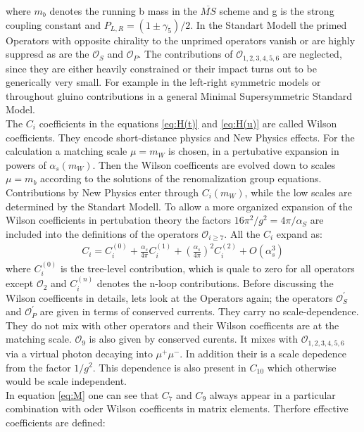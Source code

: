 \documentclass[english]{uzhpub}
\begin{document}
where $m_b$ denotes the running b mass in the $\overline{MS}$ scheme and g is the strong coupling constant and $P_{L,R} = ( 1 \pm \gamma_5)/2$. In the Standart Modell the primed Operators with opposite chirality to the unprimed operators vanish or are highly suppresd as are the $\mathcal{O}_S$ and $\mathcal{O}_P$. The contributions of $\mathcal{O}_{1,2,3,4,5,6}$ are neglected, since they are either heavily constrained or their impact turns out to be generically very small. For example in the left-right symmetric models or throughout gluino contributions in a general Minimal Supersymmetric Standard Model. \\
The $C_i$ coefficients in the equations \ref{eq:H(t)} and \ref{eq:H(u)} are called Wilson coefficients. They encode short-distance physics and New Physics effects. For the calculation a matching scale $\mu = m_W$ is chosen, in a pertubative expansion in powers of $\alpha_s (m_W)$. Then the Wilson coefficents are evolved down to scales $\mu = m_b$ according to the solutions of the renomalization group equations. Contributions by New Physics enter through $C_i(m_W)$, while the low scales are determined by the Standart Modell. To allow a more organized expansion of the Wilson coefficients in pertubation theory the factors $16 \pi^2 / g^2 = 4 \pi / \alpha_S$ are included into the definitions of the operators $\mathcal{O}_{i \geq 7}$. All the $C_i$ expand as:
\begin{align}
 C_i = C_i^{(0)} + \frac{\alpha_s}{4 \pi} C_i^{(1)} + \left( \frac{\alpha_s}{4 \pi} \right)^2 C_i^{(2)} + O(\alpha_s^3)
\end{align}
where $C_i^{(0)}$ is the tree-level contribution, which is quale to zero for all operators except $\mathcal{O}_2$ and $C_i^{(n)}$ denotes the n-loop contributions.
Before discussing the Wilson coefficents in details, lets look at the Operators again; the operators $\mathcal{O}_S^\prime$ and $\mathcal{O}_P^\prime$ are given in terms of conserved currents. They carry no scale-dependence. They do not mix with other operators and their Wilson coefficents are at the matching scale. $\mathcal{O}_9$ is also given by conserved curents. It mixes with $\mathcal{O}_{1,2,3,4,5,6}$ via a virtual photon decaying into $\mu^+ \mu^-$. In addition their is a scale depedence from the factor $1/g^2$. This dependence is also present in $C_{10}$ which otherwise would be scale independent. \\
In equation \ref{eq:M} one can see that $C_7$ and $C_9$ always appear in a particular combination with oder Wilson coefficents in matrix elements. Therfore effective coefficients are defined:
\end{document}
